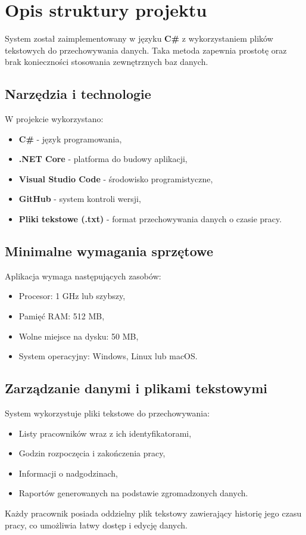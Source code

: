\chapter{Opis struktury projektu}
System został zaimplementowany w języku \textbf{C\#} z wykorzystaniem plików tekstowych do przechowywania danych. Taka metoda zapewnia prostotę oraz brak konieczności stosowania zewnętrznych baz danych.

\section{Narzędzia i technologie}
\noindent W projekcie wykorzystano:
\begin{itemize}
    \item \textbf{C\#} - język programowania,
    \item \textbf{.NET Core} - platforma do budowy aplikacji,
    \item \textbf{Visual Studio Code} - środowisko programistyczne,
    \item \textbf{GitHub} - system kontroli wersji,
    \item \textbf{Pliki tekstowe (.txt)} - format przechowywania danych o czasie pracy.
\end{itemize}

\section{Minimalne wymagania sprzętowe}
\noindent Aplikacja wymaga następujących zasobów:
\begin{itemize}
    \item Procesor: 1 GHz lub szybszy,
    \item Pamięć RAM: 512 MB,
    \item Wolne miejsce na dysku: 50 MB,
    \item System operacyjny: Windows, Linux lub macOS.
\end{itemize}

\section{Zarządzanie danymi i plikami tekstowymi}
\noindent System wykorzystuje pliki tekstowe do przechowywania:
\begin{itemize}
    \item Listy pracowników wraz z ich identyfikatorami,
    \item Godzin rozpoczęcia i zakończenia pracy,
    \item Informacji o nadgodzinach,
    \item Raportów generowanych na podstawie zgromadzonych danych.
\end{itemize}
Każdy pracownik posiada oddzielny plik tekstowy zawierający historię jego czasu pracy, co umożliwia łatwy dostęp i edycję danych.

